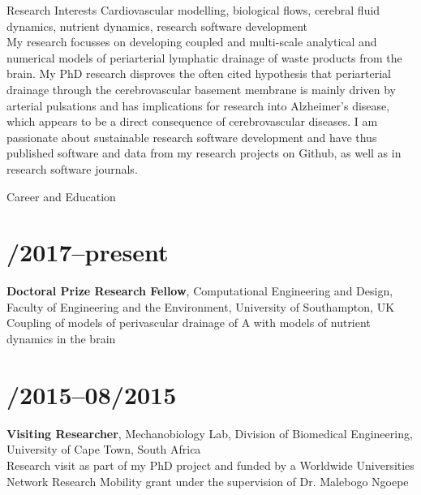 \documentclass[margin,line,10pt]{res}
\begin{document}

\address{alexandra.diem@gmail.com, \url{https://www.akdiem.com}, \url{https://github.com/akdiem}}

\begin{resume}

{\sc Research Interests} Cardiovascular modelling, biological flows, cerebral fluid dynamics, nutrient dynamics, research software development\\

My research focusses on developing coupled and multi-scale analytical and numerical models of periarterial lymphatic drainage of waste products from the brain. My PhD research disproves the often cited hypothesis that periarterial drainage through the cerebrovascular basement membrane is mainly driven by arterial pulsations and has implications for research into Alzheimer's disease, which appears to be a direct consequence of cerebrovascular diseases. I am passionate about sustainable research software development and have thus published software and data from my research projects on Github, as well as in research software journals.\\ 
  
\vspace*{-.2in}

{\sc Career and Education}\\
\vspace*{-.35in}
\section{/2017--present}{\bf Doctoral Prize Research Fellow}, Computational Engineering and Design, Faculty of Engineering and the Environment, University of Southampton, UK\\
Coupling of models of perivascular drainage of {A\textbeta} with models of nutrient dynamics in the brain\\
\vspace*{-.35in}
\section{/2015--08/2015}{\bf Visiting Researcher}, Mechanobiology Lab, Division of Biomedical Engineering, University of Cape Town, South Africa\\
Research visit as part of my PhD project and funded by a Worldwide Universities Network Research Mobility grant under the supervision of Dr. Malebogo Ngoepe\\
\vspace*{-.35in}

\end{resume}
\end{document}
